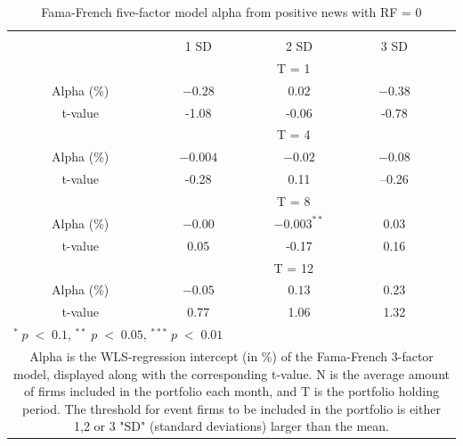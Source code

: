 \setlength{\tabcolsep}{15pt}
\begin{table}[]
\small
\centering
\caption{Fama-French five-factor model alpha from positive news with RF = 0} 
\begin{tabular}{ccccccc}
\hline \hline \\ 
 &     &  &    1 SD  &  2 SD  &  3 SD  &  \\ \cline{4-6} 
& & & \multicolumn{3}{c}{ T = 1} & \\ \cline{2-6}
& Alpha (\%)  &  & $-0.28$  & $0.02$  & $-0.38$ &  \\
& t-value &  & -1.08 & -0.06  & -0.78 & \\
& & & \multicolumn{3}{c}{ T = 4} & \\ \cline{2-6}
& Alpha (\%)  &  & $ -0.004$  & $-0.02$  &  $-0.08$ & \\
& t-value & & -0.28  & 0.11 & --0.26 & \\
& & & \multicolumn{3}{c}{ T = 8} & \\ \cline{2-6}
& Alpha (\%)  &  & $ -0.00$   & $-0.003^{**}$  & $0.03$ &  \\
& t-value &  & 0.05  & -0.17 & 0.16 & \\
&  & & \multicolumn{3}{c}{ T = 12} & \\ \cline{2-6}
& Alpha (\%)  &  & $ -0.05$  & $0.13$  & $0.23$ &  \\
& t-value &  & 0.77  & 1.06 & 1.32 & \\
\hline \hline
 \multicolumn{7}{l}{ \footnotesize $^* \; p\; <\; 0.1$, $ ^{**} \; p\; <\; 0.05$, $ ^{***} \; p\; <\; 0.01$  } \\
 \multicolumn{7}{p{11.5cm}}{ \footnotesize Alpha is the WLS-regression intercept (in \%) of the Fama-French 3-factor model, displayed along with the corresponding t-value. N is the average amount of firms included in the portfolio each month, and T is the portfolio holding period. The threshold for event firms to be included in the portfolio is either 1,2 or 3 "SD" (standard deviations) larger than the mean.}  \\ 
\end{tabular}
\label{tab: FF5_RF}
\end{table}

